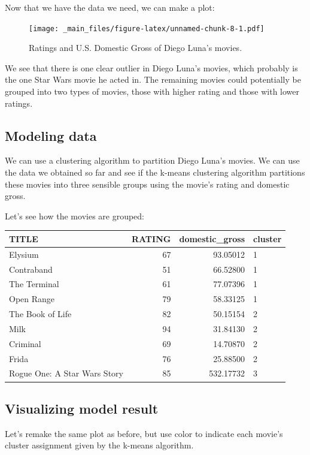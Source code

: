 \documentclass[]{article}
\theoremstyle{definition}
\theoremstyle{definition}
\theoremstyle{remark}
\begin{document}
Now that we have the data we need, we can make a plot:

\begin{figure}[htbp]
\centering
\texttt{[image: \_main\_files/figure-latex/unnamed-chunk-8-1.pdf]}
\caption{\label{fig:unnamed-chunk-8}Ratings and U.S. Domestic Gross of Diego
Luna's movies.}
\end{figure}

We see that there is one clear outlier in Diego Luna's movies, which
probably is the one Star Wars movie he acted in. The remaining movies
could potentially be grouped into two types of movies, those with higher
rating and those with lower ratings.

\subsection{Modeling data}\label{modeling-data}

We can use a clustering algorithm to partition Diego Luna's movies. We
can use the data we obtained so far and see if the k-means clustering
algorithm partitions these movies into three sensible groups using the
movie's rating and domestic gross.

Let's see how the movies are grouped:

\begin{tabular}{l|r|r|l}
\hline
TITLE & RATING & domestic\_gross & cluster\\
\hline
Elysium & 67 & 93.05012 & 1\\
\hline
Contraband & 51 & 66.52800 & 1\\
\hline
The Terminal & 61 & 77.07396 & 1\\
\hline
Open Range & 79 & 58.33125 & 1\\
\hline
The Book of Life & 82 & 50.15154 & 2\\
\hline
Milk & 94 & 31.84130 & 2\\
\hline
Criminal & 69 & 14.70870 & 2\\
\hline
Frida & 76 & 25.88500 & 2\\
\hline
Rogue One: A Star Wars Story & 85 & 532.17732 & 3\\
\hline
\end{tabular}

\subsection{Visualizing model result}\label{visualizing-model-result}

Let's remake the same plot as before, but use color to indicate each
movie's cluster assignment given by the k-means algorithm.
\end{document}
